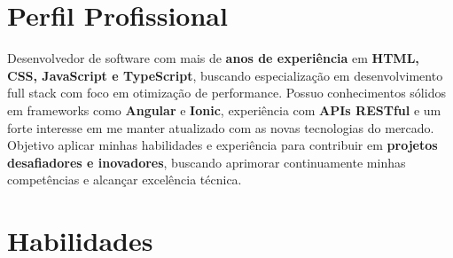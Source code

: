 \documentclass[a4paper,12pt]{article}
\begin{document}





\section{Perfil Profissional}

\small{
  Desenvolvedor de software com mais de \textbf{ anos de experiência} em \textbf{HTML, CSS, JavaScript e TypeScript}, buscando especialização em desenvolvimento full stack com foco em otimização de performance. Possuo conhecimentos sólidos em frameworks como \textbf{Angular} e \textbf{Ionic}, experiência com \textbf{APIs RESTful} e um forte interesse em me manter atualizado com as novas tecnologias do mercado. Objetivo aplicar minhas habilidades e experiência para contribuir em \textbf{projetos desafiadores e inovadores}, buscando aprimorar continuamente minhas competências e alcançar excelência técnica.
}






\section{Habilidades}

\resumeHeadingListStart{}






\resumeHeadingListEnd{}



\end{document}
